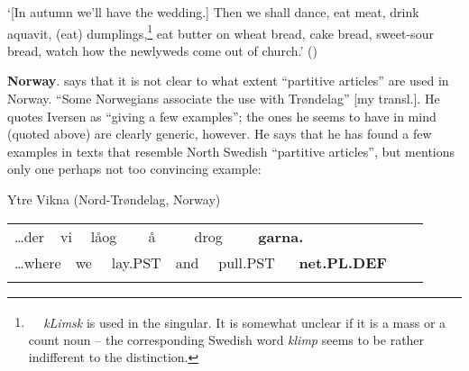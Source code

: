 \begin{styleTranslation}
‘[In autumn we’ll have the wedding.] Then we shall dance, eat meat, drink aquavit, (eat) dumplings,\footnote{\textsuperscript{\ \ } \textit{kLimsk} is used in the singular. It is somewhat unclear if it is a mass or a count noun – the corresponding Swedish word \textit{klimp} seems to be rather indifferent to the distinction.  } eat butter on wheat bread, cake bread, sweet-sour bread, watch how the newlyweds come out of church.’ (\citet[76]{Vendell1882})

\end{styleTranslation}

\begin{styleBodytextC}
\textbf{Norway}. \citet[16]{Delsing2003a} says that it is not clear to what extent “partitive articles” are used in Norway. “Some Norwegians associate the use with Trøndelag” [my transl.]. He quotes Iversen as “giving a few examples”; the ones he seems to have in mind (quoted above) are clearly generic, however. He says that he has found a few examples in texts that resemble North Swedish “partitive articles”, but mentions only one perhaps not too convincing example: 

\end{styleBodytextC}

\begin{listWWNumileveli}
\item 

\begin{styleExample}
Ytre Vikna (Nord-Trøndelag, Norway)

\end{styleExample}

\end{listWWNumileveli}

\begin{tabular}{llllllllllllll}
\lsptoprule
…der & \multicolumn{2}{l}{vi

} & \multicolumn{2}{l}{låog

} & \multicolumn{2}{l}{å

} & \multicolumn{2}{l}{drog

} & \multicolumn{2}{l}{{\bfseries garna.}

} & \multicolumn{2}{l}{} & \\
\multicolumn{2}{l}{…where

} & \multicolumn{2}{l}{we

} & \multicolumn{2}{l}{lay.PST 

} & \multicolumn{2}{l}{and

} & \multicolumn{2}{l}{pull.PST

} & \multicolumn{2}{l}{{\bfseries net.PL.DEF}

} & \multicolumn{2}{l}{}\\
\lspbottomrule
\end{tabular}

